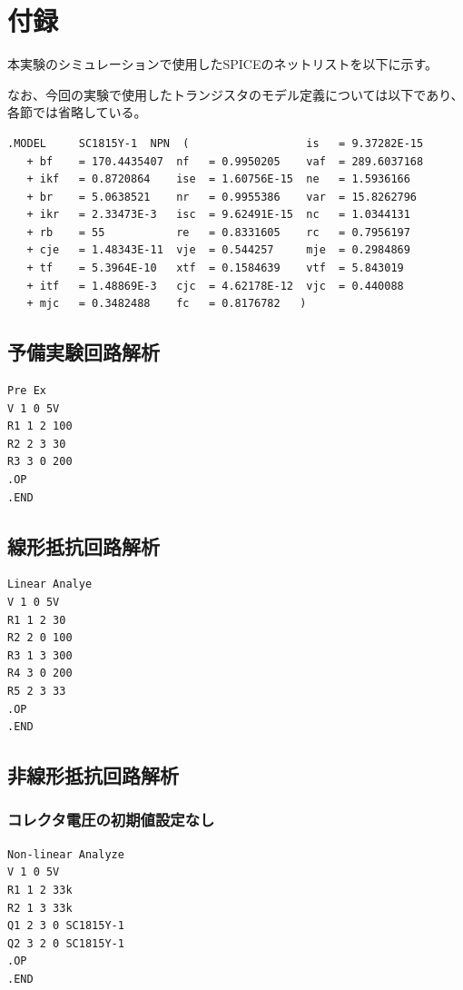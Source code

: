 \documentclass{jlreq}
\numberwithin{equation}{section}
\begin{document}
\section{付録}
本実験のシミュレーションで使用したSPICEのネットリストを以下に示す。

なお、今回の実験で使用したトランジスタのモデル定義については以下であり、各節では省略している。
\begin{verbatim}
.MODEL     SC1815Y-1  NPN  (                  is   = 9.37282E-15  
   + bf    = 170.4435407  nf   = 0.9950205    vaf  = 289.6037168  
   + ikf   = 0.8720864    ise  = 1.60756E-15  ne   = 1.5936166 
   + br    = 5.0638521    nr   = 0.9955386    var  = 15.8262796  
   + ikr   = 2.33473E-3   isc  = 9.62491E-15  nc   = 1.0344131  
   + rb    = 55           re   = 0.8331605    rc   = 0.7956197  
   + cje   = 1.48343E-11  vje  = 0.544257     mje  = 0.2984869  
   + tf    = 5.3964E-10   xtf  = 0.1584639    vtf  = 5.843019  
   + itf   = 1.48869E-3   cjc  = 4.62178E-12  vjc  = 0.440088  
   + mjc   = 0.3482488    fc   = 0.8176782	 )
\end{verbatim}

\subsection{予備実験回路解析}
\begin{verbatim}
Pre Ex
V 1 0 5V
R1 1 2 100
R2 2 3 30
R3 3 0 200
.OP
.END
\end{verbatim}

\subsection{線形抵抗回路解析}
\begin{verbatim}
Linear Analye
V 1 0 5V
R1 1 2 30
R2 2 0 100
R3 1 3 300
R4 3 0 200
R5 2 3 33
.OP
.END
\end{verbatim}

\subsection{非線形抵抗回路解析}
\subsubsection{コレクタ電圧の初期値設定なし}
\begin{verbatim}
Non-linear Analyze
V 1 0 5V
R1 1 2 33k
R2 1 3 33k
Q1 2 3 0 SC1815Y-1
Q2 3 2 0 SC1815Y-1
.OP
.END
\end{verbatim}
\end{document}
